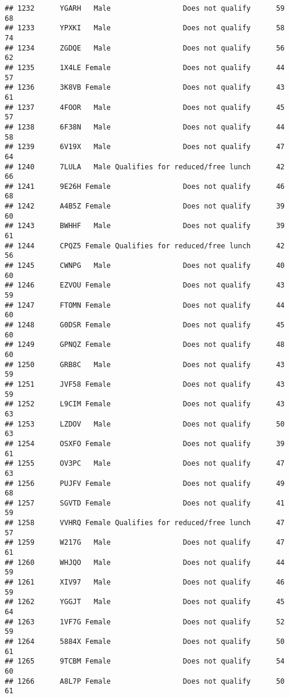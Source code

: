 \documentclass[
]{article}
\begin{document}
\begin{verbatim}
## 1232      YGARH   Male                 Does not qualify      59       68
## 1233      YPXKI   Male                 Does not qualify      58       74
## 1234      ZGDQE   Male                 Does not qualify      56       62
## 1235      1X4LE Female                 Does not qualify      44       57
## 1236      3K8VB Female                 Does not qualify      43       61
## 1237      4FOOR   Male                 Does not qualify      45       57
## 1238      6F38N   Male                 Does not qualify      44       58
## 1239      6V19X   Male                 Does not qualify      47       64
## 1240      7LULA   Male Qualifies for reduced/free lunch      42       66
## 1241      9E26H Female                 Does not qualify      46       68
## 1242      A4B5Z Female                 Does not qualify      39       60
## 1243      BWHHF   Male                 Does not qualify      39       61
## 1244      CPQZ5 Female Qualifies for reduced/free lunch      42       56
## 1245      CWNPG   Male                 Does not qualify      40       60
## 1246      EZVOU Female                 Does not qualify      43       59
## 1247      FTOMN Female                 Does not qualify      44       60
## 1248      G0DSR Female                 Does not qualify      45       60
## 1249      GPNQZ Female                 Does not qualify      48       60
## 1250      GRB8C   Male                 Does not qualify      43       59
## 1251      JVF58 Female                 Does not qualify      43       59
## 1252      L9CIM Female                 Does not qualify      43       63
## 1253      LZDOV   Male                 Does not qualify      50       63
## 1254      OSXFO Female                 Does not qualify      39       61
## 1255      OV3PC   Male                 Does not qualify      47       63
## 1256      PUJFV Female                 Does not qualify      49       68
## 1257      SGVTD Female                 Does not qualify      41       59
## 1258      VVHRQ Female Qualifies for reduced/free lunch      47       57
## 1259      W217G   Male                 Does not qualify      47       61
## 1260      WHJQO   Male                 Does not qualify      44       59
## 1261      XIV97   Male                 Does not qualify      46       59
## 1262      YGGJT   Male                 Does not qualify      45       64
## 1263      1VF7G Female                 Does not qualify      52       59
## 1264      5884X Female                 Does not qualify      50       61
## 1265      9TCBM Female                 Does not qualify      54       60
## 1266      A8L7P Female                 Does not qualify      50       61

\end{verbatim}
\end{document}
